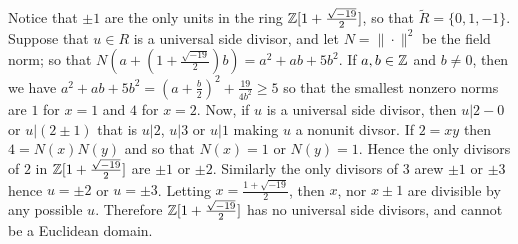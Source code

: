 \begin{example}\label{example_6.3}
  Notice that $\pm 1$ are the only units in the ring
  $\mathbb{Z}[1+\frac{\sqrt{-19}}{2}]$, so that $\tilde{R}=\{0,1,-1\}$. Suppose that
  $u \in R$ is a universal side divisor, and let $N=\|\cdot\|^2$ be the field
  norm; so that $N(a+(1+\frac{\sqrt{-19}}{2})b)=a^2+ab+5b^2$. If $a,b \in \mathbb{Z}$
  and $b \neq 0$, then we have $a^2+ab+5b^2=(a+\frac{b}{2})^2+\frac{19}{4b^2}
  \geq 5$ so that the smallest nonzero norms are $1$ for $x=1$ and $4$ for $x=2$.
  Now, if $u$ is a universal side divisor, then  $u|2-0$ or  $u|(2 \pm 1)$
  that is $u|2$,  $u|3$ or  $u|1$ making  $u$ a nonunit divsor. If  $2=xy$
  then $4=N(x)N(y)$ and so that $N(x)=1$ or  $N(y)=1$. Hence the only
  divisors of $2$ in  $\mathbb{Z}[1+\frac{\sqrt{-19}}{2}]$ are $\pm 1$ or  $\pm 2$.
  Similarly the only divisors of  $3$ arew  $\pm 1$ or  $\pm 3$ hence  $u=\pm
  2$ or  $u=\pm 3$. Letting  $x=\frac{1+\sqrt{-19}}{2}$, then $x$, nor  $x
  \pm 1$ are divisible by any possible $u$. Therefore
  $\mathbb{Z}[1+\frac{\sqrt{-19}}{2}]$ has no universal side divisors, and cannot be a
  Euclidean domain.
\end{example}
